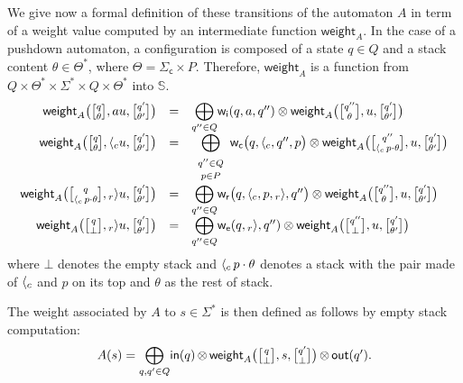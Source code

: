 \documentclass[a4paper,11pt]{article}
\newcommand{\Semiring}{\mathbb{S}}
\def\weight{\mathsf{weight}}
\def\wei{\mathsf{w}}
\newcommand{\call}[1]{\ensuremath \langle_{#1}}
\newcommand{\return}[1]{\ensuremath {}_{#1}{\rangle}} %
\def\Sigmac{{\Sigma_\mathsf{c}}}
\def\weii{{\wei_\mathsf{i}}}
\def\weic{{\wei_\mathsf{c}}}
\def\weir{{\wei_\mathsf{r}}}
\def\weie{{\wei_\mathsf{e}}}
\newcommand{\config}[2]{\ensuremath \genfrac{[}{]}{0pt}{}{#1}{#2}}
\begin{document}
We give now a formal definition of these transitions of the automaton $A$
in term of a weight value
computed by an intermediate function $\weight_A$.
In the case of a pushdown automaton, a configuration is composed 
of a state $q \in Q$ and a stack content $\theta \in \Theta^*$, where $\Theta = \Sigmac \times P$.
Therefore, $\weight_A$ is a function from 
$Q \times \Theta^* \times \Sigma^* \times Q \times \Theta^*$ into $\Semiring$.
\[
\begin{array}{rcl}
\weight_A\bigl(\config{q}{\theta}, a u, \config{q'}{\theta'}\bigr) & = & 
 {\displaystyle\bigoplus_{q'' \in Q}} \weii(q, a, q'') 
 \otimes \weight_A\bigl(\config{q''}{\theta}, u, \config{q'}{\theta'}\bigr)\\
%
\weight_A\bigl(\config{q}{\theta}, {\call{c}} u, \config{q'}{\theta'}\bigr) & = & 
 {\displaystyle\bigoplus_{\begin{array}{c}
                          \scriptstyle q'' \in Q\\[-2pt]
                          \scriptstyle p \in P
                          \end{array}}}
 \weic\bigl(q, {\call{c}}, q'', p\bigr) 
 \otimes \weight_A\bigl(\config{q''}{{\call{c}}\, p\cdot \theta}, u, \config{q'}{\theta'}\bigr)\\[1mm]
%
\weight_A\bigl(\config{q}{{\call{c}}\, p\cdot \theta}, {\return{r}} u, \config{q'}{\theta'}\bigr) & = & 
 {\displaystyle\bigoplus_{q'' \in Q}} 
 \weir\bigl(q, {\call{c}}, p, {\return{r}}, q''\bigr) 
 \otimes \weight_A\bigl(\config{q''}{\theta}, u, \config{q'}{\theta'}\bigr)\\
%
\weight_A\bigl(\config{q}{\bot}, {\return{r}} u, \config{q'}{\theta'}\bigr) & = & 
 {\displaystyle\bigoplus_{q'' \in Q}} \weie(q, {\return{r}}, q'') 
 \otimes \weight_A\bigl(\config{q''}{\bot}, u, \config{q'}{\theta'}\bigr)\\
\end{array}
\]
where $\bot$ denotes the empty stack and ${\call{c}}\, p\cdot \theta$ 
denotes a stack with the pair made of ${\call{c}}$ and $p$ on its top and $\theta$
as the rest of stack.

\noindent
The weight associated by $A$ to $s \in \Sigma^*$
is then defined as follows by empty stack computation: 
\[
A(s)  = 
{\displaystyle\bigoplus_{q, q' \in Q}} \textstyle
\mathsf{in}(q) \mathop{\otimes} 
\weight_A\bigl(\config{q}{\bot}, s, \config{q'}{\bot}\bigr) 
\mathop{\otimes} \mathsf{out}(q').
\]



\end{document}
